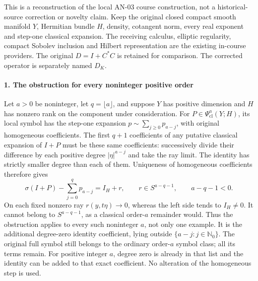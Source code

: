\documentclass[
  11pt,
]{article}
\begin{document}
This is a reconstruction of the local AN-03 course construction, not a
historical-source correction or novelty claim. Keep the original closed
compact smooth manifold \(Y\), Hermitian bundle \(H\), density,
cotangent norm, every real exponent and step-one classical expansion.
The receiving calculus, elliptic regularity, compact Sobolev inclusion
and Hilbert representation are the existing in-course providers. The
original \(D=I+C^*C\) is retained for comparison. The corrected operator
is separately named \(D_K\).

\paragraph{1. The obstruction for every noninteger positive
order}\label{the-obstruction-for-every-noninteger-positive-order}

Let \(a>0\) be noninteger, let \(q=\lfloor a\rfloor\), and suppose \(Y\)
has positive dimension and \(H\) has nonzero rank on the component under
consideration. For \(P\in\Psi^a_{\mathrm{cl}}(Y;H)\), its local symbol
has the step-one expansion \(p\sim\sum_{j\geq0}p_{a-j}\), with original
homogeneous coefficients. The first \(q+1\) coefficients of any putative
classical expansion of \(I+P\) must be these same coefficients:
successively divide their difference by each positive degree
\(|\eta|^{a-j}\) and take the ray limit. The identity has strictly
smaller degree than each of them. Uniqueness of homogeneous coefficients
therefore gives \[
 \sigma(I+P)-\sum_{j=0}^{q}p_{a-j}
 =I_H+r,\qquad r\in S^{a-q-1},\qquad a-q-1<0.
 \tag{OR1}
\] On each fixed nonzero ray \(r(y,t\eta)\to0\), whereas the left side
tends to \(I_H\ne0\). It cannot belong to \(S^{a-q-1}\), as a classical
order-\(a\) remainder would. Thus the obstruction applies to every such
noninteger \(a\), not only one example. It is the additional degree-zero
identity coefficient, lying outside \(\{a-j:j\in\mathbb N_0\}\). The
original full symbol still belongs to the ordinary order-\(a\) symbol
class; all its terms remain. For positive integer \(a\), degree zero is
already in that list and the identity can be added to that exact
coefficient. No alteration of the homogeneous step is used.
\end{document}
